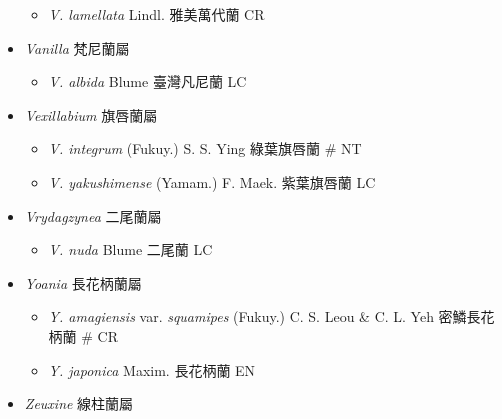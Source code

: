 \begin{itemize}
  \begin{itemize}
        \item[] \textit{V. lamellata} Lindl.  雅美萬代蘭   CR
  \end{itemize}
 \item[] \textit{Vanilla} 梵尼蘭屬
                                
  \begin{itemize}
        \item[] \textit{V. albida} Blume  臺灣凡尼蘭   LC
  \end{itemize}
 \item[] \textit{Vexillabium} 旗唇蘭屬
                                
  \begin{itemize}
        \item[] \textit{V. integrum} (Fukuy.) S. S. Ying  綠葉旗唇蘭  \# NT
        \item[] \textit{V. yakushimense} (Yamam.) F. Maek.  紫葉旗唇蘭   LC
  \end{itemize}
 \item[] \textit{Vrydagzynea} 二尾蘭屬
                                
  \begin{itemize}
        \item[] \textit{V. nuda} Blume  二尾蘭   LC
  \end{itemize}
 \item[] \textit{Yoania} 長花柄蘭屬
                                
  \begin{itemize}
        \item[] \textit{Y. amagiensis} var. \textit{squamipes} (Fukuy.) C. S. Leou \& C. L. Yeh  密鱗長花柄蘭  \# CR
        \item[] \textit{Y. japonica} Maxim.  長花柄蘭   EN
  \end{itemize}
 \item[] \textit{Zeuxine} 線柱蘭屬
                                

\end{itemize}
